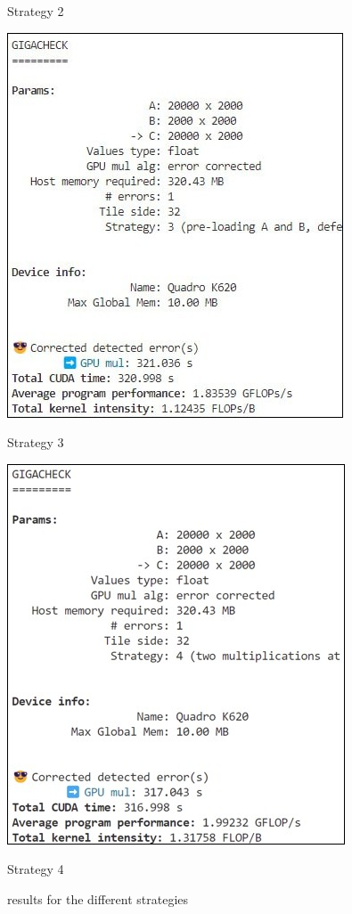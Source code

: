 \begin{figure}[h!]
	\caption*{Strategy 2}
	\endminipage\hfill
	\linebreak
	\vspace{.02\textwidth}
	\linebreak
	\includegraphics[width=\textwidth]{images/result_s3}
	\caption*{Strategy 3}
	\endminipage\hfill
	\includegraphics[width=\textwidth]{images/result_s4}
	\caption*{Strategy 4}
	\endminipage\hfill
	\caption{\centering results for the different strategies}\label{img:results-strategies}
\end{figure}

